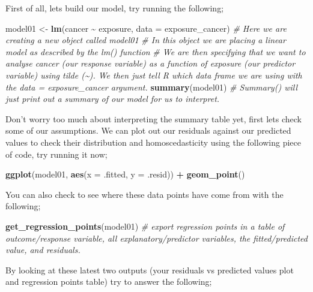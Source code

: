 \documentclass[
]{book}
\newenvironment{Shaded}{\begin{snugshade}}{\end{snugshade}}
\newcommand{\AttributeTok}[1]{\textcolor[rgb]{0.13,0.29,0.53}{#1}}
\newcommand{\CommentTok}[1]{\textcolor[rgb]{0.56,0.35,0.01}{\textit{#1}}}
\newcommand{\FunctionTok}[1]{\textcolor[rgb]{0.13,0.29,0.53}{\textbf{#1}}}
\newcommand{\NormalTok}[1]{#1}
\newcommand{\OtherTok}[1]{\textcolor[rgb]{0.56,0.35,0.01}{#1}}
\newcommand{\SpecialCharTok}[1]{\textcolor[rgb]{0.81,0.36,0.00}{\textbf{#1}}}
\begin{document}
First of all, lets build our model, try running the following;

\begin{Shaded}
\begin{Highlighting}[]
\NormalTok{model01 }\OtherTok{\textless{}{-}} \FunctionTok{lm}\NormalTok{(cancer }\SpecialCharTok{\textasciitilde{}}\NormalTok{ exposure, }\AttributeTok{data =}\NormalTok{ exposure\_cancer)}
\CommentTok{\# Here we are creating a new object called model01}
\CommentTok{\# In this object we are placing a linear model as described by the lm() function}
\CommentTok{\# We are then specifying that we want to analyse cancer (our response variable) as a function of exposure (our predictor variable) using tilde (\textasciitilde{}). We then just tell R which data frame we are using with the data = exposure\_cancer argument. }
\FunctionTok{summary}\NormalTok{(model01)}
\CommentTok{\# Summary() will just print out a summary of our model for us to interpret.}
\end{Highlighting}
\end{Shaded}

Don't worry too much about interpreting the summary table yet, first lets check some of our assumptions. We can plot out our residuals against our predicted values to check their distribution and homoscedasticity using the following piece of code, try running it now;

\begin{Shaded}
\begin{Highlighting}[]
\FunctionTok{ggplot}\NormalTok{(model01, }\FunctionTok{aes}\NormalTok{(}\AttributeTok{x =}\NormalTok{ .fitted, }\AttributeTok{y =}\NormalTok{ .resid)) }\SpecialCharTok{+}
  \FunctionTok{geom\_point}\NormalTok{()}
\end{Highlighting}
\end{Shaded}

You can also check to see where these data points have come from with the following;

\begin{Shaded}
\begin{Highlighting}[]
\FunctionTok{get\_regression\_points}\NormalTok{(model01)}
\CommentTok{\# export regression points in a table of outcome/response variable, all explanatory/predictor variables, the fitted/predicted value, and residuals.}
\end{Highlighting}
\end{Shaded}

By looking at these latest two outputs (your residuals vs predicted values plot and regression points table) try to answer the following;
\end{document}
